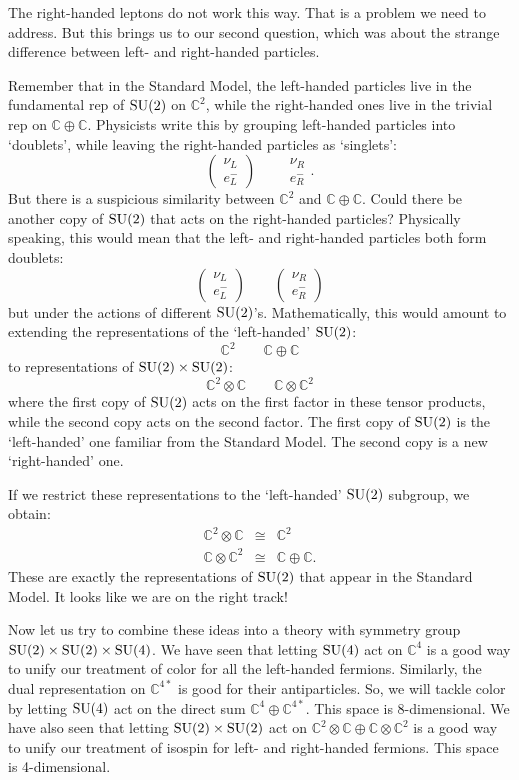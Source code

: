 \documentclass[12pt]{article}
\newcommand{\C}{{\mathbb C}}  %
\newcommand{\SU}{{\rm SU}}    %
\newcommand{\iso}{\cong} %
\newcommand{\lep}{\left( \! \begin{array}{c} \nu_L \\ e^-_L \end{array} \! \right)} %
\begin{document}
The right-handed leptons do not work this way.  That is a problem
we need to address.  But this brings us to our second question, 
which was about the strange difference between left- and right-handed 
particles. 

Remember that in the Standard Model, the left-handed particles live 
in the fundamental rep of $\SU(2)$ on $\C^2$, while the right-handed 
ones live in the trivial rep on $\C \oplus \C$. Physicists write this 
by grouping left-handed particles into `doublets', while leaving the
right-handed particles as `singlets':
\[ \lep \quad \quad 
\begin{array}{c}
	\nu_R \\
	e^-_R 
\end{array}.
\]
But there is a suspicious similarity between $\C^2$ and $\C \oplus \C$. Could
there be another copy of $\SU(2)$ that acts on the right-handed particles?
Physically speaking, this would mean that the left- and right-handed particles 
both form doublets:
\[ \lep \quad \quad 
\left( \!
\begin{array}{c}
	\nu_R \\
	e^-_R
\end{array}
\! \right)
\]
but under the actions of different $\SU(2)$'s.  Mathematically, this 
would amount to extending the representations of the `left-handed' $\SU(2)$:
\[ \C^2 \quad \quad \C \oplus \C \]
to representations of $\SU(2) \times \SU(2)$:
\[ \C^2 \otimes \C \quad \quad \C \otimes \C^2 \]
where the first copy of $\SU(2)$ acts on
the first factor in these tensor products, while the second copy acts on
the second factor.  The first copy of $\SU(2)$ is the `left-handed'
one familiar from the Standard Model.  The second copy is a new
`right-handed' one.

If we restrict these representations to the `left-handed' $\SU(2)$
subgroup, we obtain:
\begin{eqnarray*} 
	\C^2 \otimes \C & \iso & \C^2 \\ 
	\C \otimes \C^2 & \iso & \C \oplus \C .
\end{eqnarray*}
These are exactly the representations of $\SU(2)$ that appear in 
the Standard Model. It looks like we are on the right track!

Now let us try to combine these ideas into a theory with symmetry group 
$\SU(2) \times \SU(2) \times \SU(4)$.   We have seen that letting 
$\SU(4)$ act on $\C^4$ is a good way to unify our treatment
of color for all the left-handed fermions.  Similarly, the dual representation 
on $\C^{4*}$ is good for their antiparticles.   So, we will tackle color
by letting $\SU(4)$ act on the direct sum $\C^4 \oplus \C^{4*}$.   This 
space is 8-dimensional.  We have also seen that letting $\SU(2) \times \SU(2)$ 
act on $\C^2 \otimes \C \oplus \C \otimes \C^2$ is a good way to unify our 
treatment of isospin for left- and right-handed fermions.  This space is 
4-dimensional. 
\end{document}
